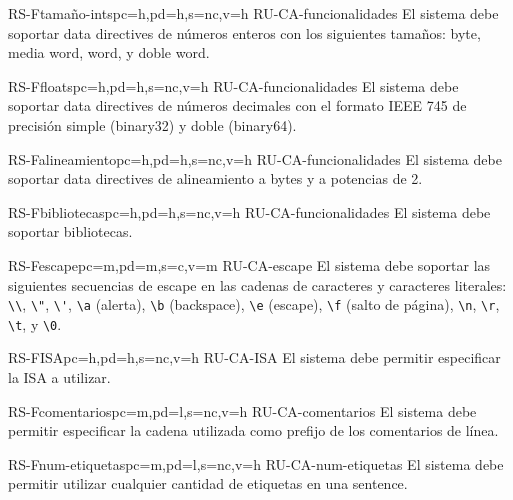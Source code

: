 \begin{softwareReq}{RS-F}{tamaño-ints}{pc=h,pd=h,s=nc,v=h}
    {RU-CA-funcionalidades}
    El sistema debe soportar \glspl{data directive} de números enteros con los
    siguientes tamaños: byte, media \gls{word}, \gls{word}, y doble \gls{word}.
\end{softwareReq}

\begin{softwareReq}{RS-F}{floats}{pc=h,pd=h,s=nc,v=h}
    {RU-CA-funcionalidades}
    El sistema debe soportar \glspl{data directive} de números decimales con el
    formato IEEE 745 de precisión simple (binary32) y doble (binary64).
\end{softwareReq}

\begin{softwareReq}{RS-F}{alineamiento}{pc=h,pd=h,s=nc,v=h}
    {RU-CA-funcionalidades}
    El sistema debe soportar \glspl{data directive} de alineamiento a bytes y a
    potencias de 2.
\end{softwareReq}

\begin{softwareReq}{RS-F}{bibliotecas}{pc=h,pd=h,s=nc,v=h}
    {RU-CA-funcionalidades}
    El sistema debe soportar bibliotecas. %
\end{softwareReq}

\begin{softwareReq}{RS-F}{escape}{pc=m,pd=m,s=c,v=m}
    {RU-CA-escape}
    El sistema debe soportar las siguientes secuencias de escape en las cadenas
    de caracteres y caracteres literales: \verb!\\!, \verb!\"!, \verb!\'!,
    \verb!\a! (alerta), \verb!\b! (backspace), \verb!\e! (escape), \verb!\f!
    (salto de página), \verb!\n!, \verb!\r!, \verb!\t!, y \verb!\0!.
\end{softwareReq}

\begin{softwareReq}{RS-F}{ISA}{pc=h,pd=h,s=nc,v=h}
    {RU-CA-ISA}
    El sistema debe permitir especificar la \gls{ISA} a utilizar.
\end{softwareReq}

\begin{softwareReq}{RS-F}{comentarios}{pc=m,pd=l,s=nc,v=h}
    {RU-CA-comentarios}
    El sistema debe permitir especificar la cadena utilizada como prefijo de los
    comentarios de línea.
\end{softwareReq}

\begin{softwareReq}{RS-F}{num-etiquetas}{pc=m,pd=l,s=nc,v=h}
    {RU-CA-num-etiquetas}
    El sistema debe permitir utilizar cualquier cantidad de etiquetas en una
    \gls{sentence}.
\end{softwareReq}

